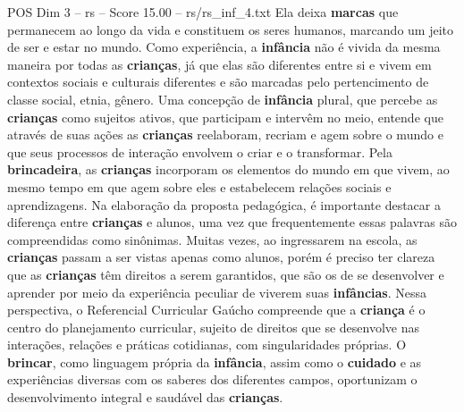 \begin{textsample}{POS Dim 3 – rs – Score 15.00 – rs/rs\_inf\_4.txt}
Ela deixa \textbf{marcas} que permanecem ao longo da vida e constituem os seres humanos, marcando um jeito de ser e estar no mundo.
Como experiência, a \textbf{infância} não é vivida da mesma maneira por todas as \textbf{crianças}, já que elas são diferentes entre si e vivem em contextos sociais e culturais diferentes e são marcadas pelo pertencimento de classe social, etnia, gênero.
Uma concepção de \textbf{infância} plural, que percebe as \textbf{crianças} como sujeitos ativos, que participam e intervêm no meio, entende que através de suas ações as \textbf{crianças} reelaboram, recriam e agem sobre o mundo e que seus processos de interação envolvem o criar e o transformar.
Pela \textbf{brincadeira}, as \textbf{crianças} incorporam os elementos do mundo em que vivem, ao mesmo tempo em que agem sobre eles e estabelecem relações sociais e aprendizagens.
Na elaboração da proposta pedagógica, é importante destacar a diferença entre \textbf{crianças} e alunos, uma vez que frequentemente essas palavras são compreendidas como sinônimas.
Muitas vezes, ao ingressarem na escola, as \textbf{crianças} passam a ser vistas apenas como alunos, porém é preciso ter clareza que as \textbf{crianças} têm direitos a serem garantidos, que são os de se desenvolver e aprender por meio da experiência peculiar de viverem suas \textbf{infâncias}.
Nessa perspectiva, o Referencial Curricular Gaúcho compreende que a \textbf{criança} é o centro do planejamento curricular, sujeito de direitos que se desenvolve nas interações, relações e práticas cotidianas, com singularidades próprias.
O \textbf{brincar}, como linguagem própria da \textbf{infância}, assim como o \textbf{cuidado} e as experiências diversas com os saberes dos diferentes campos, oportunizam o desenvolvimento integral e saudável das \textbf{crianças}.

\end{textsample}
